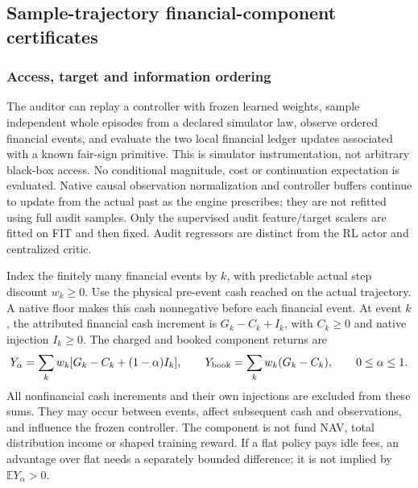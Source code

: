 \subsection{Sample-trajectory financial-component certificates}
\label{app:sampleonlyaudit}

\subsubsection{Access, target and information ordering}
The auditor can replay a controller with frozen learned weights, sample independent whole episodes from a declared simulator law, observe ordered financial events, and evaluate the two local financial ledger updates associated with a known fair-sign primitive. This is simulator instrumentation, not arbitrary black-box access. No conditional magnitude, cost or continuation expectation is evaluated. Native causal observation normalization and controller buffers continue to update from the actual past as the engine prescribes; they are not refitted using full audit samples. Only the supervised audit feature/target scalers are fitted on FIT and then fixed. Audit regressors are distinct from the RL actor and centralized critic.

Index the finitely many financial events by $k$, with predictable actual step discount $w_k\ge0$. Use the physical pre-event cash reached on the actual trajectory. A native floor makes this cash nonnegative before each financial event. At event $k$, the attributed financial cash increment is $G_k-C_k+I_k$, with $C_k\ge0$ and native injection $I_k\ge0$. The charged and booked component returns are
\[
Y_\alpha=\sum_k w_k[G_k-C_k+(1-\alpha)I_k],\qquad
Y_{\rm book}=\sum_k w_k(G_k-C_k),\qquad 0\le\alpha\le1.
\]
All nonfinancial cash increments and their own injections are excluded from these sums. They may occur between events, affect subsequent cash and observations, and influence the frozen controller. The component is not fund NAV, total distribution income or shaped training reward. If a flat policy pays idle fees, an advantage over flat needs a separately bounded difference; it is not implied by $\mathbb EY_\alpha>0$.

